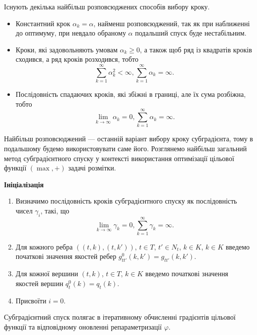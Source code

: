 Існують декілька найбільш розповсюджених способів вибору кроку.
\begin{itemize}
    \item Константний крок $\alpha_k=\alpha$, найменш розповсюджений, так як 
    при наближенні до оптимуму, при невдало обраному $\alpha$ подальший спуск буде нестабільним.
    \item Кроки, які задовольняють умовам
    $\alpha_k\geq 0$, а також щоб ряд із квадратів кроків сходився, а ряд кроків розходився, тобто 
    \begin{equation*}
        \sum\limits_{k=1}^{\infty} \alpha_k^2 < \infty, \sum\limits_{k=1}^{\infty} \alpha_k = \infty.
    \end{equation*}
    \item Послідовність спадаючих кроків, які збіжні в границі, але їх сума розбіжна, тобто
    \begin{equation*}
        \lim\limits_{k\rightarrow\infty}\alpha_k=0, \sum\limits_{k=1}^{\infty} \alpha_k = \infty.
    \end{equation*}
  \end{itemize}

Найбільш розповсюджений --- останній варіант вибору кроку субградієнта, тому в подальшому
будемо використовувати саме його.
Розглянемо найбільш загальний метод субградієнтного спуску у контексті 
використання оптимізації цільової функції $(\max,+)$ задачі розмітки.

\textbf{Ініціалізація}

\begin{enumerate}
    \item Визначимо послідовність кроків субградієнтного спуску як послідовність чисел
    $\gamma_i$, такі, що
    \begin{equation*}
        \lim\limits_{k\rightarrow\infty}\gamma_k=0, \sum\limits_{k=1}^{\infty} \gamma_k = \infty.
    \end{equation*}
    \item Для кожного ребра $((t,k),(t,k'))$, $t\in T$, $t'\in N_t$, $k\in K$, $k\in K$ введемо 
    початкові значення якостей ребер $g^0_{tt'}(k,k')=g_{tt'}(k,k')$.
    \item Для кожної вершини $(t,k)$, $t\in T$, $k\in K$ введемо початкові значення
    якостей вершин $q^0_t(k)=q_t(k)$.
    \item Присвоїти $i=0$.
\end{enumerate}

Субградієнтний спуск полягає в ітеративному обчисленні градієнтів цільової 
функції та відповідному оновленні репараметризації $\varphi$.

